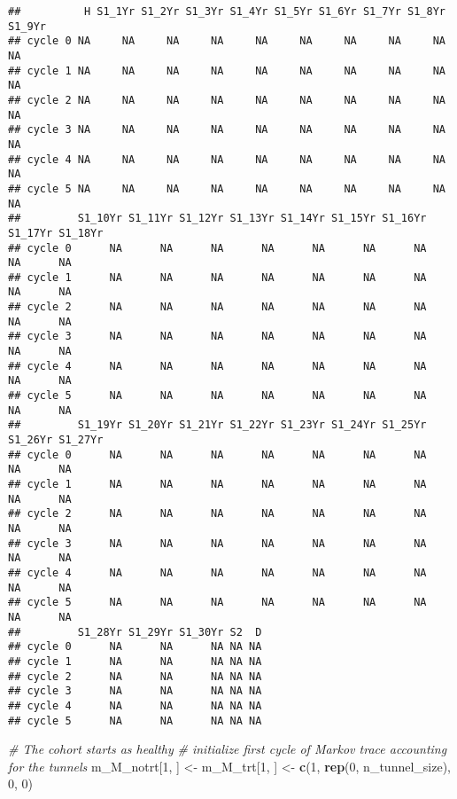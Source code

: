 \documentclass[
]{article}
\newenvironment{Shaded}{\begin{snugshade}}{\end{snugshade}}
\newcommand{\CommentTok}[1]{\textcolor[rgb]{0.56,0.35,0.01}{\textit{#1}}}
\newcommand{\DecValTok}[1]{\textcolor[rgb]{0.00,0.00,0.81}{#1}}
\newcommand{\KeywordTok}[1]{\textcolor[rgb]{0.13,0.29,0.53}{\textbf{#1}}}
\newcommand{\NormalTok}[1]{#1}
\newcommand{\StringTok}[1]{\textcolor[rgb]{0.31,0.60,0.02}{#1}}
\begin{document}
\begin{verbatim}
##          H S1_1Yr S1_2Yr S1_3Yr S1_4Yr S1_5Yr S1_6Yr S1_7Yr S1_8Yr S1_9Yr
## cycle 0 NA     NA     NA     NA     NA     NA     NA     NA     NA     NA
## cycle 1 NA     NA     NA     NA     NA     NA     NA     NA     NA     NA
## cycle 2 NA     NA     NA     NA     NA     NA     NA     NA     NA     NA
## cycle 3 NA     NA     NA     NA     NA     NA     NA     NA     NA     NA
## cycle 4 NA     NA     NA     NA     NA     NA     NA     NA     NA     NA
## cycle 5 NA     NA     NA     NA     NA     NA     NA     NA     NA     NA
##         S1_10Yr S1_11Yr S1_12Yr S1_13Yr S1_14Yr S1_15Yr S1_16Yr S1_17Yr S1_18Yr
## cycle 0      NA      NA      NA      NA      NA      NA      NA      NA      NA
## cycle 1      NA      NA      NA      NA      NA      NA      NA      NA      NA
## cycle 2      NA      NA      NA      NA      NA      NA      NA      NA      NA
## cycle 3      NA      NA      NA      NA      NA      NA      NA      NA      NA
## cycle 4      NA      NA      NA      NA      NA      NA      NA      NA      NA
## cycle 5      NA      NA      NA      NA      NA      NA      NA      NA      NA
##         S1_19Yr S1_20Yr S1_21Yr S1_22Yr S1_23Yr S1_24Yr S1_25Yr S1_26Yr S1_27Yr
## cycle 0      NA      NA      NA      NA      NA      NA      NA      NA      NA
## cycle 1      NA      NA      NA      NA      NA      NA      NA      NA      NA
## cycle 2      NA      NA      NA      NA      NA      NA      NA      NA      NA
## cycle 3      NA      NA      NA      NA      NA      NA      NA      NA      NA
## cycle 4      NA      NA      NA      NA      NA      NA      NA      NA      NA
## cycle 5      NA      NA      NA      NA      NA      NA      NA      NA      NA
##         S1_28Yr S1_29Yr S1_30Yr S2  D
## cycle 0      NA      NA      NA NA NA
## cycle 1      NA      NA      NA NA NA
## cycle 2      NA      NA      NA NA NA
## cycle 3      NA      NA      NA NA NA
## cycle 4      NA      NA      NA NA NA
## cycle 5      NA      NA      NA NA NA
\end{verbatim}

\begin{Shaded}
\begin{Highlighting}[]
\CommentTok{# The cohort starts as healthy}
\CommentTok{# initialize first cycle of Markov trace accounting for the tunnels}
\NormalTok{m_M_notrt[}\DecValTok{1}\NormalTok{, ] <-}\StringTok{ }\NormalTok{m_M_trt[}\DecValTok{1}\NormalTok{, ] <-}\StringTok{ }\KeywordTok{c}\NormalTok{(}\DecValTok{1}\NormalTok{, }\KeywordTok{rep}\NormalTok{(}\DecValTok{0}\NormalTok{, n_tunnel_size), }\DecValTok{0}\NormalTok{, }\DecValTok{0}\NormalTok{) }
\end{Highlighting}
\end{Shaded}
\end{document}
